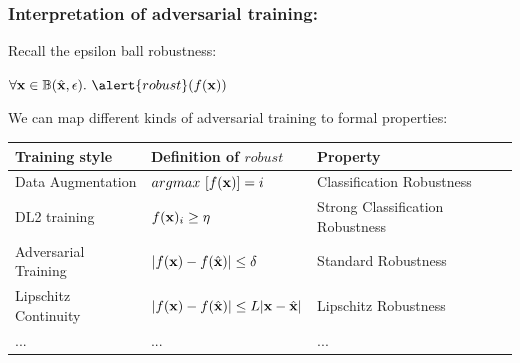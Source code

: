 \documentclass[t,compress,aspectratio=169]{beamer}
\begin{document}
\begin{frame}
  \frametitle{Interpretation of adversarial training:}
  \vspace{-2em}
      \begin{block}{Recall the epsilon ball robustness:}

       $\forall \x \in \mathbb{B}(\hat{\x}, \epsilon). \ \alert{robust}(f(\x)) $
\end{block}

     We can map different kinds of adversarial training to formal properties:
\begin{tabular}{p{3.5cm}|p{4cm}| p{4cm}}
Training style & Definition of \alert{$robust$} & Property \\ \hline \hline
Data Augmentation & 	$ argmax\ [f(\mathbf{x})] = i$  & Classification Robustness\\ \hline
DL2 training & 	$f(\mathbf{x})_i \geq \eta$  & Strong Classification Robustness \\ \hline
Adversarial Training & 	$ |f(\mathbf{x}) - f(\hat{\mathbf{x}})| \leq \delta$ & Standard Robustness\\ \hline
Lipschitz Continuity & 	$ |f(\mathbf{x}) - f(\hat{\mathbf{x}})| \leq L|\mathbf{x}-\hat{\mathbf{x}}|$ & Lipschitz Robustness \\ \hline
          ... & ... &  ... \\

	\end{tabular}


       {\scriptsize
 \begin{thebibliography}{99}
   \beamertemplatearticlebibitems
\end{thebibliography}}




  \end{frame}
\end{document}
